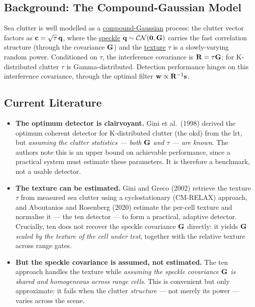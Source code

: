 \documentclass{article}
\begin{document}
\subsection{Background: The Compound-Gaussian Model}
Sea clutter is well modelled as a \underline{compound-Gaussian} process: the clutter vector factors as $\vb c = \sqrt{\tau}\,\vb q$, where the \underline{speckle} $\vb q\sim\mathcal{CN}(\vb 0,\mathbf{G})$ carries the fast correlation structure (through the covariance $\mathbf{G}$) and the \underline{texture} $\tau$ is a slowly-varying random power. Conditioned on $\tau$, the interference covariance is $\mathbf{R} = \tau\mathbf{G}$; for K-distributed clutter $\tau$ is Gamma-distributed. Detection performance hinges on this interference covariance, through the optimal filter $\vb w\propto\mathbf{R}^{-1}\vb s$.

\subsection{Current Literature}
\begin{itemize}
  \item \textbf{The optimum detector is clairvoyant.} Gini et al.\ (1998) derived the optimum coherent detector for K-distributed clutter (the \gls{okd}) from the \gls{lrt}, but \emph{assuming the clutter statistics --- both $\mathbf{G}$ and $\tau$ --- are known}. The authors note this is an upper bound on achievable performance, since a practical system must estimate these parameters. It is therefore a benchmark, not a usable detector.
  \item \textbf{The texture can be estimated.} Gini and Greco (2002) retrieve the texture $\tau$ from measured sea clutter using a cyclostationary (CM-RELAX) approach, and Aboutanios and Rosenberg (2020) estimate the per-cell texture and normalise it --- the \gls{ten} detector --- to form a practical, adaptive detector. Crucially, \gls{ten} does not recover the speckle covariance $\mathbf{G}$ directly: it yields $\mathbf{G}$ \emph{scaled by the texture of the cell under test}, together with the relative texture across range gates.
  \item \textbf{But the speckle covariance is assumed, not estimated.} The \gls{ten} approach handles the texture while \emph{assuming the speckle covariance $\mathbf{G}$ is shared and homogeneous across range cells}. This is convenient but only approximate: it fails when the clutter \emph{structure} --- not merely its power --- varies across the scene.
\end{itemize}
\end{document}
